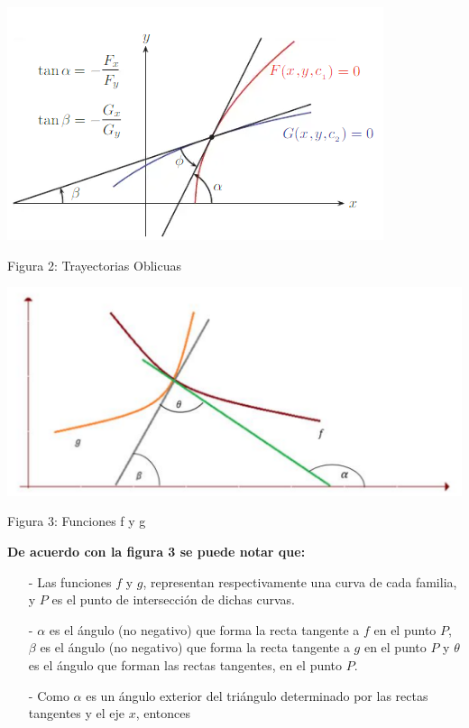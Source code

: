 \documentclass[12pt,letterpaper]{article}
\begin{document}
\begin{titlepage}


\begin{center}

\includegraphics[scale=1]{Figura Trayec Oblicuas}

Figura 2: Trayectorias Oblicuas
\end{center}

\begin{center}

\includegraphics[scale=0.9]{Fig Funciones f y g}

Figura 3: Funciones f y g 
\end{center}
\begin{flushleft}

\textbf{De acuerdo con la figura 3 se puede notar que: } \\
\begin{itemize}
\item[-] Las funciones $f$ y $g$, representan respectivamente una curva de cada familia, y $P$ es el punto de intersección de dichas curvas.

\item[-] $\alpha$ es el ángulo (no negativo) que forma la recta tangente a $f$ en el punto $P$, $\beta$ es el ángulo (no negativo) que forma la recta tangente a $g$ en el punto $P$ y $\theta$ es el ángulo que forman las rectas tangentes, en el punto $P$.
\item[-] Como $\alpha$ es un ángulo exterior del triángulo determinado por las rectas tangentes y el eje $x$, entonces \\


\end{itemize}
\end{flushleft}
\end{titlepage}
\end{document}

